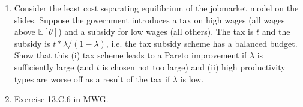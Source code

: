 \documentclass[a4paper,12pt]{article}
\begin{document}
\begin{enumerate}
\item Consider the least cost separating equilibrium of the jobmarket model on the slides. Suppose the government introduces a tax on high wages (all wages above $\mathbb{E}[\theta ]$) and a subsidy for low wages (all others). The tax is $t$ and the subsidy is $t*\lambda/(1-\lambda)$, i.e. the tax subsidy scheme has a balanced budget. Show that this (i) tax scheme leads to a Pareto improvement if $\lambda$ is sufficiently large (and $t$ is chosen not too large) and (ii) high productivity types are worse off as a result of the tax if $\lambda$ is low. 
\item Exercise 13.C.6 in MWG.
\end{enumerate}

\end{document}
